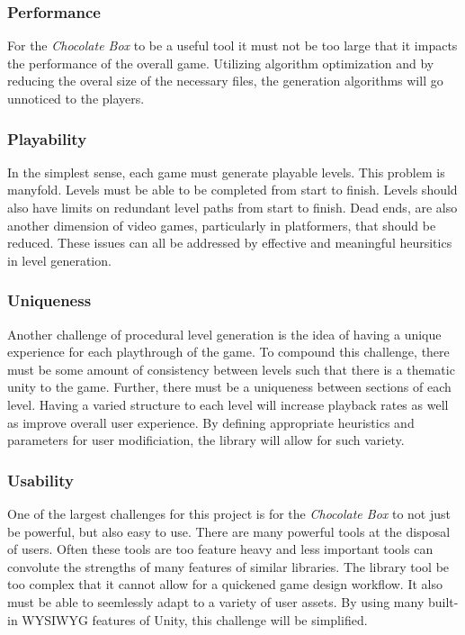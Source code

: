 \documentclass[pdftex,12pt,letter]{article}
\begin{document}
\begin{itemize}
\begin{itemize}
\begin{itemize}
\subsubsection{Performance}
For the \textit{Chocolate Box} to be a useful tool it must not be too large that it impacts the performance of the overall game. Utilizing algorithm optimization and by reducing the overal size of the necessary files, the generation algorithms will go unnoticed to the players. 
\subsubsection{Playability}
In the simplest sense, each game must generate playable levels. This problem is manyfold. Levels must be able to be completed from start to finish. Levels should also have limits on redundant level paths from start to finish. Dead ends, are also another dimension of video games, particularly in platformers, that should be reduced. These issues can all be addressed by effective and meaningful heursitics in level generation.
\subsubsection{Uniqueness}
Another challenge of procedural level generation is the idea of having a unique experience for each playthrough of the game. To compound this challenge, there must be some amount of consistency between levels such that there is a thematic unity to the game. Further, there must be a uniqueness between sections of each level. Having a varied structure to each level will increase playback rates as well as improve overall user experience. By defining appropriate heuristics and parameters for user modificiation, the library will allow for such variety. 
\subsubsection{Usability}
One of the largest challenges for this project is for the \textit{Chocolate Box} to not just be powerful, but also easy to use. There are many powerful tools at the disposal of users. Often these tools are too feature heavy and less important tools can convolute the strengths of many features of similar libraries. The library tool be too complex that it cannot allow for a quickened game design workflow. It also must be able to seemlessly adapt to a variety of user assets. By using many built-in WYSIWYG features of Unity, this challenge will be simplified. 



\end{itemize}
\end{itemize}
\end{itemize}
\end{document}
